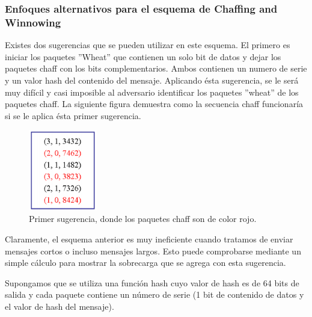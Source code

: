 \documentclass[12pt, a4paper, titlepage]{article}
\begin{document}
        \subsubsection{Enfoques alternativos para el esquema de Chaffing and Winnowing}
        
        Existes dos sugerencias que se pueden utilizar en este esquema. El primero es iniciar los paquetes ''Wheat'' que contienen un solo bit de datos y dejar los paquetes chaff con los bits complementarios. Ambos contienen un numero de serie y un valor hash del contenido del mensaje. Aplicando ésta sugerencia, se le será muy difícil y casi imposible al adversario identificar los paquetes ''wheat'' de los paquetes chaff. La siguiente figura demuestra como la secuencia chaff funcionaría si se le aplica ésta primer sugerencia.
        
        \begin{figure}[H]
			\begin{center}	          \includegraphics[width=3cm]{./imagenes/esquema1.png}
				\caption{Primer sugerencia, donde los paquetes chaff son de color rojo.}
			\end{center}
		\end{figure}
        
        Claramente, el esquema anterior es muy ineficiente cuando tratamos de enviar mensajes cortos o incluso mensajes largos. Esto puede comprobarse mediante un simple cálculo para mostrar la sobrecarga que se agrega con esta sugerencia.
        
        Supongamos que se utiliza una función hash cuyo valor de hash es de 64 bits de salida y cada paquete contiene un número de serie (1 bit de contenido de datos y el valor de hash del mensaje).
        
\end{document}
